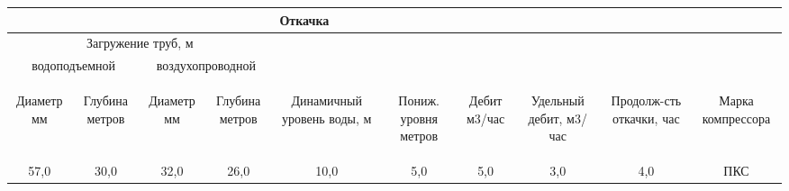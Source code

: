 \documentclass[a4paper,12pt]{article} %
\newcommand{\txtDebit}{5,0}							%
\begin{document}
\begin{center}
\begin{tabular}{|c|c|c|c|c|c|c|c|c|c|}
	\hline 
	\multicolumn{8}{|c|}{Откачка}&  &  \\ 
	\hline 
	\multicolumn{4}{|c|}{Загружение труб, м}  &  &  &  &  &  &  \\ 
	\hline 
	\multicolumn{2}{|c|}{водоподъемной} & \multicolumn{2}{c|}{воздухопроводной} &  &  &  &  &  & \\ 
	\hline 
	\begin{sideways}Диаметр мм\end{sideways} &
	\begin{sideways}Глубина метров\end{sideways} &
	\begin{sideways}Диаметр мм\end{sideways} &
	\begin{sideways}Глубина метров\end{sideways} &
	\begin{sideways}Динамичный уровень воды, м\end{sideways} &
	\begin{sideways}Пониж. уровня метров\end{sideways} &
	\begin{sideways}Дебит м3/час\end{sideways} &
	\begin{sideways}Удельный дебит, м3/час\end{sideways} &
	\begin{sideways}Продолж-сть откачки, час\end{sideways} &
	\begin{sideways}Марка компрессора\end{sideways} \\ 
	\hline 
	57,0 & 30,0 & 32,0 & 26,0 & 10,0 & 5,0 & \txtDebit & 3,0 & 4,0 & ПКС \\ 
	\hline 
\end{tabular} 
\end{center}


\end{document}
